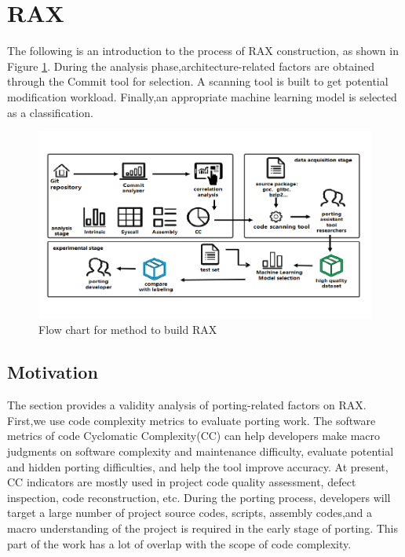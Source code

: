 \documentclass[sigconf,screen,review,anonymous]{acmart}
\begin{document}
\section{RAX}
The following is an introduction to the process of RAX construction, as shown in Figure \ref{fig:flow-chart}.
During the analysis phase,architecture-related factors are obtained through the Commit tool for selection.
A scanning tool is built to get potential modification workload.
Finally,an appropriate machine learning model is selected as a classification.

\begin{figure}
  \centering
  \includegraphics[width=\linewidth]{flow-chart.pdf}
  \caption{Flow chart for method to build RAX}
  \label{fig:flow-chart}
\end{figure}

\subsection{Motivation}
The section provides a validity analysis of porting-related factors on RAX.
First,we use code complexity metrics to evaluate porting work.
The software metrics of code Cyclomatic Complexity(CC) can help developers make macro judgments on software complexity and maintenance difficulty, evaluate potential and hidden porting difficulties, and help the tool improve accuracy.
At present, CC indicators are mostly used in project code quality assessment, defect inspection, code reconstruction, etc.
During the porting process, developers will target a large number of project source codes, scripts, assembly codes,and a macro understanding of the project is required in the early stage of porting.
This part of the work has a lot of overlap with the scope of code complexity.
\end{document}
